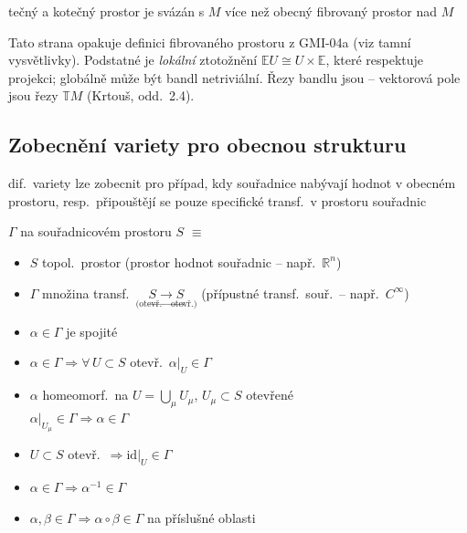 tečný a kotečný prostor je svázán s $M$ více než obecný fibrovaný prostor nad $M$

\begin{vysvetleni}[Opakování]
Tato strana opakuje definici fibrovaného prostoru z GMI-04a (viz tamní vysvětlivky). Podstatné je \emph{lokální} ztotožnění $\mathbb{E}U\cong U\times\mathbb{E}$,
které respektuje projekci; globálně může být bandl netriviální. Řezy bandlu jsou  -- vektorová pole jsou řezy $\mathbb{T}M$ (Krtouš, odd.~2.4).
\end{vysvetleni}

\newpage
{}
\subsection{Zobecnění variety pro obecnou strukturu}

dif.\ variety lze zobecnit pro případ, kdy souřadnice nabývají hodnot v obecném prostoru,
resp.\ připouštějí se pouze specifické transf.\ v prostoru souřadnic

\begin{definice}
 $\Gamma$  na souřadnicovém prostoru $S$ $\equiv$
\begin{itemize}[nosep]
  \item[] $S$ \quad topol.\ prostor \hfill (prostor hodnot souřadnic -- např.\ $\mathbb{R}^n$)
  \item[] $\Gamma$ \quad množina transf.\ $\underset{\text{(otevř.}\to\text{otevř.)}}{S\to S}$ \hfill (přípustné transf.\ souř.\ -- např.\ $C^\infty$)
  \item[--] $\alpha\in\Gamma$ je spojité
  \item[--] $\alpha\in\Gamma \Rightarrow \forall\, U\subset S$ otevř.\ \quad $\alpha|_U\in\Gamma$
  \item[--] $\alpha$ homeomorf.\ na $U = \bigcup_\mu U_\mu$, \quad $U_\mu\subset S$ otevřené \\
            $\alpha|_{U_\mu}\in\Gamma \Rightarrow \alpha\in\Gamma$
  \item[--] $U\subset S$ otevř.\ $\Rightarrow \mathrm{id}|_U\in\Gamma$
  \item[--] $\alpha\in\Gamma \Rightarrow \alpha^{-1}\in\Gamma$
  \item[--] $\alpha,\beta\in\Gamma \Rightarrow \alpha\circ\beta\in\Gamma$ \quad na příslušné oblasti
\end{itemize}
\end{definice}

